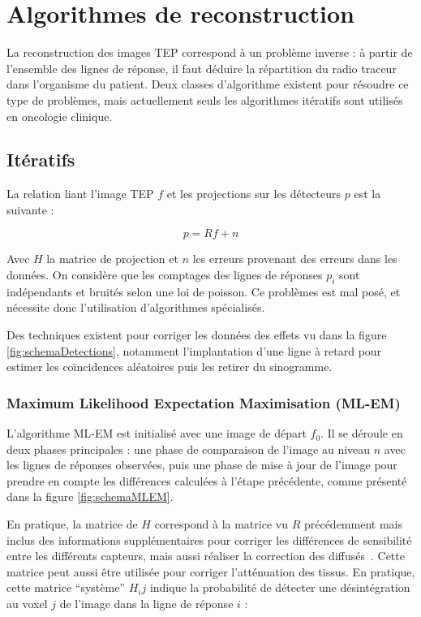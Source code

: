 \chapter{Algorithmes de reconstruction}

La reconstruction des images TEP correspond à un problème inverse : à partir de l'ensemble des lignes de réponse, il faut déduire la répartition du radio traceur dans l'organisme du patient. Deux classes d'algorithme existent pour résoudre ce type de problèmes, mais actuellement seuls les algorithmes itératifs sont utilisés en oncologie clinique. 

	\section{Itératifs}

La relation liant l'image TEP $f$ et les projections sur les détecteurs $p$ est la suivante :

\begin{equation}
	p = R f + n
\end{equation}

Avec $H$ la matrice de projection et $n$ les erreurs provenant des erreurs dans les données. On considère que les comptages des lignes de réponses $p_i$ sont indépendants et bruités selon une loi de poisson. Ce problèmes est mal posé, et nécessite donc l'utilisation d'algorithmes spécialisés. 

Des techniques existent pour corriger les données des effets vu dans la figure \ref{fig:schemaDetections}, notamment l'implantation d'une ligne à retard pour estimer les coïncidences aléatoires puis les retirer du sinogramme.

		\subsection{Maximum Likelihood Expectation Maximisation (ML-EM) }


L'algorithme ML-EM est initialisé avec une image de départ $f_0$. Il se déroule en deux phases principales : une phase de comparaison de l'image au niveau $n$ avec les lignes de réponses observées, puis une phase de mise à jour de l'image pour prendre en compte les différences calculées à l'étape précédente, comme présenté dans la figure \ref{fig:schemaMLEM}.

En pratique, la matrice de $H$ correspond à la matrice vu $R$ précédemment mais inclus des informations supplémentaires pour corriger les différences de sensibilité entre les différents capteurs, mais aussi réaliser la correction des diffusés~\cite{shepp1982maximum,chornoboy1990evaluation}. Cette matrice peut aussi être utilisée pour corriger l'atténuation des tissus. En pratique, cette matrice ``système'' $H_ij$ indique la probabilité de détecter une désintégration au voxel $j$ de l'image dans la ligne de réponse $i$ :

